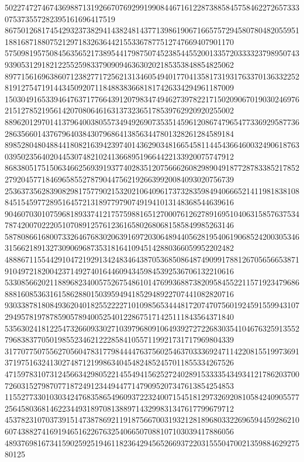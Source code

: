\documentclass[10pt,
b5paper,
fleqn,
dvipdfmx,
uplatex
]{jsarticle}
\begin{document}
502274727467436988713192667076929919908446716122873885845758462272657333075373557282395161696417519\\86750126817454293237382941438248143771398619067166575729458078048205595118816871880752129718326364421553367877512747669407901170\\57509819575084563565217389544179875074523854455200133572033332379895074393905312918212255259833790909463630202185353848854825062\\89771561696386071238277172562131346054940177041358173193176337013633225281912754719144345092071184883836681817426334294961187009\\15030491653394647637177664391207983474946273978221715020906701903024697621512785219561420708064616313732365178539762920920255002\\88962012970141379640038055734949269073535145961208674796547733692958773628635660143767964038430796864138563447801328261284589184\\89852804804884418082163942397401436290348166545811445436646003249061876303950235640204453074821024136689519664422133920075747912\\86838051751506346625693919377402835120756662608298904918772878338521785227920457718469658552787904475621926639920084093020756739\\25363735628390829817577902153202106409617373283598494066652141198183810884515459772895164572131897797907491941013148368544639616\\90460703010759681893374121757598816512700076126278916951040631585763753478742007022205107089125761236165802680681585849985263146\\58780866168007332646768302063916972030648944056281954061906852420030534631566218913273090696873531816410945142880366059952202482\\48886711554429104721929134248346438705368508648749099178812670565665387191049721820042371492740164460943459845392536706132210616\\53308566202118896823400575267548610147699368873820958455221157192347968688816085363161586288015039594941852948922707441082820716\\93033878180849362040182552222710109856534448172074707560192459155994310729495781978785905789400525401228675171425111843564371840\\53563024181225473266093302710397968091064939272722683035410467632591355279683837705019855234621222858410557119921731717969804339\\31770775075562705604783177984444763756025463703336924711422081551997369137197516324130274871219986340454824852457011855334267526\\47159783107312456634298052214554941562527240289153333543493412178620370072603152798707718724912344944771479095207347613854254853\\11552773301030342476835865496093722324007154518129732692081058424090557725645803681462234493189708138897143299831347617799679712\\45378231070373915147387869211918756670031932128189680332269659445928621060743882741691946516226763254066507088107103039417886056\\48937698167341590259251946118236429456526693722031555047002135988462927580125
\end{document}
